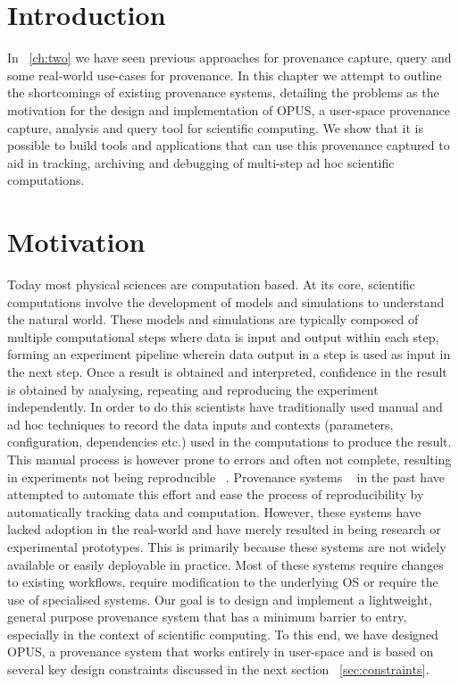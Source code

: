 \documentclass[withindex,glossary]{cam-thesis}
\begin{document}
\section{Introduction}
In ~\ref{ch:two} we have seen previous approaches for provenance capture, query and some real-world use-cases for provenance. In this chapter we attempt to outline the shortcomings of existing provenance systems, detailing the problems as the motivation for the design and implementation of OPUS, a user-space provenance capture, analysis and query tool for scientific computing. We show that it is possible to build tools and applications that can use this provenance captured to aid in tracking, archiving and debugging of multi-step ad hoc scientific computations.

\section{Motivation}
Today most physical sciences are computation based.
At its core, scientific computations involve the development of models and simulations to understand the natural world. 
These models and simulations are typically composed of multiple computational steps where data is input and output within each step, forming an experiment pipeline wherein data output in a step is used as input in the next step.
Once a result is obtained and interpreted, confidence in the result is obtained by analysing, repeating and reproducing the experiment independently.
In order to do this scientists have traditionally used manual and ad hoc techniques to record the data inputs and contexts (parameters, configuration, dependencies etc.) used in the computations to produce the result.
This manual process is however prone to errors and often not complete, resulting in experiments not being reproducible ~\cite{non-rep, nature}. 
Provenance systems ~\cite{PASS, BURRITO, StoyBook} in the past have attempted to automate this effort and ease the process of reproducibility by automatically tracking data and computation.
However, these systems have lacked adoption in the real-world and have merely resulted in being research or experimental prototypes.
This is primarily because these systems are not widely available or easily deployable in practice.
Most of these systems require changes to existing workflows, require modification to the underlying OS or require the use of specialised systems.
Our goal is to design and implement a lightweight, general purpose provenance system that has a minimum barrier to entry, especially in the context of scientific computing.
To this end, we have designed OPUS, a provenance system that works entirely in user-space and is based on several key design constraints discussed in the next section ~\ref{sec:constraints}.
\end{document}
